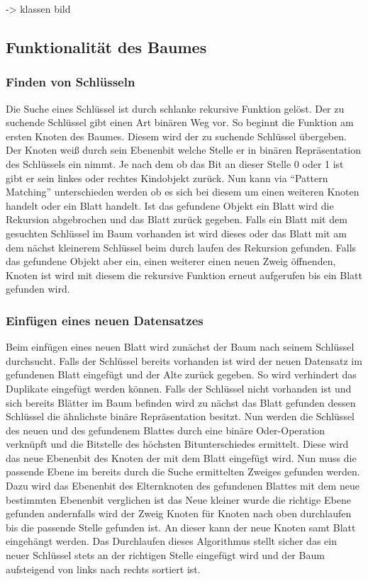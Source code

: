 \documentclass[a4paper,11pt,oneside,%
headsepline,												%
footsepline,												%
bibtotocnumbered									%
]{scrreprt}
\begin{document}
-> klassen bild\\
\subsection{Funktionalität des Baumes}
\subsubsection{Finden von Schlüsseln}
Die Suche eines Schlüssel ist durch schlanke rekursive Funktion gelöst. Der zu suchende Schlüssel gibt einen Art binären Weg vor. So beginnt die Funktion am ersten Knoten des Baumes. Diesem wird der zu suchende Schlüssel übergeben. Der Knoten weiß durch sein Ebenenbit welche Stelle er in binären Repräsentation des Schlüssels ein nimmt. Je nach dem ob das Bit an dieser Stelle 0 oder 1 ist gibt er sein linkes oder rechtes Kindobjekt zurück. Nun kann via \enquote{Pattern Matching} unterschieden werden ob es sich bei diesem um einen weiteren Knoten handelt oder ein Blatt handelt. Ist das gefundene Objekt ein Blatt wird die Rekursion abgebrochen und das Blatt zurück gegeben. Falls ein Blatt mit dem gesuchten Schlüssel im Baum vorhanden ist wird dieses oder das Blatt mit am dem nächst kleinerem Schlüssel beim durch laufen des Rekursion gefunden. Falls das gefundene Objekt aber ein, einen weiterer einen neuen Zweig öffnenden, Knoten ist wird mit diesem die rekursive Funktion erneut aufgerufen bis ein Blatt gefunden wird.
\subsubsection{Einfügen eines neuen Datensatzes}
Beim einfügen eines neuen Blatt wird zunächst der Baum nach seinem Schlüssel durchsucht. Falls der Schlüssel bereits vorhanden ist wird der neuen Datensatz im gefundenen Blatt eingefügt und der Alte zurück gegeben. So wird verhindert das Duplikate eingefügt werden können. Falls der Schlüssel nicht vorhanden ist und sich bereits Blätter im Baum befinden wird zu nächst das Blatt gefunden dessen Schlüssel die ähnlichste binäre Repräsentation besitzt. Nun werden die Schlüssel des neuen und des gefundenem Blattes durch eine binäre Oder-Operation verknüpft und  die Bitstelle des höchsten Bitunterschiedes ermittelt. Diese wird das neue Ebenenbit des Knoten der mit dem Blatt eingefügt wird. Nun muss die passende Ebene im bereits durch die Suche ermittelten Zweiges gefunden werden. Dazu wird das Ebenenbit des Elternknoten des gefundenen Blattes mit dem neue bestimmten Ebenenbit verglichen ist das Neue kleiner wurde die richtige Ebene gefunden andernfalls wird der Zweig Knoten für Knoten nach oben durchlaufen bis die passende Stelle gefunden ist. An dieser kann der neue Knoten samt Blatt eingehängt werden. Das Durchlaufen dieses Algorithmus stellt sicher das ein neuer Schlüssel stets an der richtigen Stelle eingefügt wird und der Baum aufsteigend von links nach rechts sortiert ist.
\end{document}
